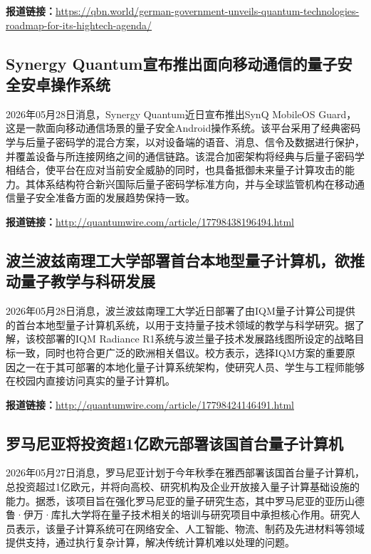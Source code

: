 \documentclass[12pt,a4paper]{ctexart}
\begin{document}
\noindent\textbf{报道链接：}\url{https://qbn.world/german-government-unveils-quantum-technologies-roadmap-for-its-hightech-agenda/}

\subsection{ Synergy Quantum宣布推出面向移动通信的量子安全安卓操作系统 }

2026年05月28日消息，Synergy Quantum近日宣布推出SynQ MobileOS Guard，这是一款面向移动通信场景的量子安全Android操作系统。该平台采用了经典密码学与后量子密码学的混合方案，以对设备端的语音、消息、信令及数据进行保护，并覆盖设备与所连接网络之间的通信链路。该混合加密架构将经典与后量子密码学相结合，使平台在应对当前安全威胁的同时，也具备抵御未来量子计算攻击的能力。其体系结构符合新兴国际后量子密码学标准方向，并与全球监管机构在移动通信量子安全准备方面的发展趋势保持一致。

\noindent\textbf{报道链接：}\url{http://quantumwire.com/article/17798438196494.html}

\subsection{ 波兰波兹南理工大学部署首台本地型量子计算机，欲推动量子教学与科研发展 }

2026年05月28日消息，波兰波兹南理工大学近日部署了由IQM量子计算公司提供的首台本地型量子计算机系统，以用于支持量子技术领域的教学与科学研究。据了解，该校部署的IQM Radiance R1系统与波兰量子技术发展路线图所设定的战略目标一致，同时也符合更广泛的欧洲相关倡议。校方表示，选择IQM方案的重要原因之一在于其可部署的本地化量子计算系统架构，使研究人员、学生与工程师能够在校园内直接访问真实的量子计算机。

\noindent\textbf{报道链接：}\url{http://quantumwire.com/article/17798424146491.html}

\subsection{ 罗马尼亚将投资超1亿欧元部署该国首台量子计算机 }

2026年05月27日消息，罗马尼亚计划于今年秋季在雅西部署该国首台量子计算机，总投资超过1亿欧元，并将向高校、研究机构及企业开放接入量子计算基础设施的能力。据悉，该项目旨在强化罗马尼亚的量子研究生态，其中罗马尼亚的亚历山德鲁·伊万·库扎大学将在量子技术相关的培训与研究项目中承担核心作用。研究人员表示，该量子计算系统可在网络安全、人工智能、物流、制药及先进材料等领域提供支持，通过执行复杂计算，解决传统计算机难以处理的问题。
\end{document}
